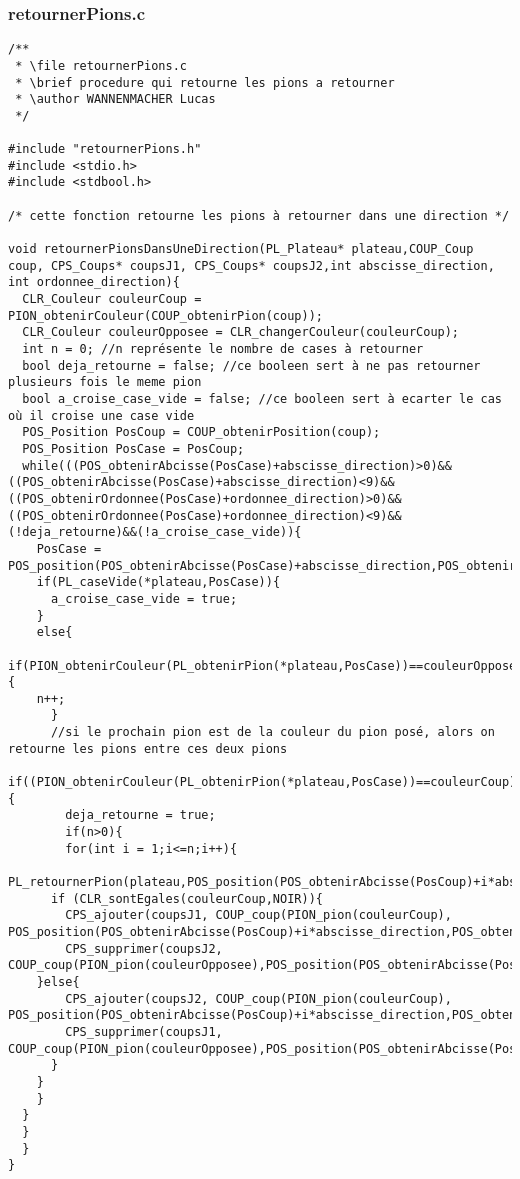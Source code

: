 \subsubsection{retournerPions.c}
\begin{lstlisting}
/**
 * \file retournerPions.c
 * \brief procedure qui retourne les pions a retourner
 * \author WANNENMACHER Lucas
 */

#include "retournerPions.h"
#include <stdio.h>
#include <stdbool.h>

/* cette fonction retourne les pions à retourner dans une direction */

void retournerPionsDansUneDirection(PL_Plateau* plateau,COUP_Coup coup, CPS_Coups* coupsJ1, CPS_Coups* coupsJ2,int abscisse_direction, int ordonnee_direction){
  CLR_Couleur couleurCoup = PION_obtenirCouleur(COUP_obtenirPion(coup));
  CLR_Couleur couleurOpposee = CLR_changerCouleur(couleurCoup);
  int n = 0; //n représente le nombre de cases à retourner
  bool deja_retourne = false; //ce booleen sert à ne pas retourner plusieurs fois le meme pion
  bool a_croise_case_vide = false; //ce booleen sert à ecarter le cas où il croise une case vide
  POS_Position PosCoup = COUP_obtenirPosition(coup);
  POS_Position PosCase = PosCoup;
  while(((POS_obtenirAbcisse(PosCase)+abscisse_direction)>0)&&((POS_obtenirAbcisse(PosCase)+abscisse_direction)<9)&&((POS_obtenirOrdonnee(PosCase)+ordonnee_direction)>0)&&((POS_obtenirOrdonnee(PosCase)+ordonnee_direction)<9)&&(!deja_retourne)&&(!a_croise_case_vide)){
    PosCase = POS_position(POS_obtenirAbcisse(PosCase)+abscisse_direction,POS_obtenirOrdonnee(PosCase)+ordonnee_direction);
    if(PL_caseVide(*plateau,PosCase)){
      a_croise_case_vide = true;
    }
    else{
      if(PION_obtenirCouleur(PL_obtenirPion(*plateau,PosCase))==couleurOpposee){
	n++;
      }
      //si le prochain pion est de la couleur du pion posé, alors on retourne les pions entre ces deux pions
      if((PION_obtenirCouleur(PL_obtenirPion(*plateau,PosCase))==couleurCoup)){
        deja_retourne = true;
        if(n>0){
        for(int i = 1;i<=n;i++){
          PL_retournerPion(plateau,POS_position(POS_obtenirAbcisse(PosCoup)+i*abscisse_direction,POS_obtenirOrdonnee(PosCoup)+i*ordonnee_direction));
	  if (CLR_sontEgales(couleurCoup,NOIR)){
	    CPS_ajouter(coupsJ1, COUP_coup(PION_pion(couleurCoup), POS_position(POS_obtenirAbcisse(PosCoup)+i*abscisse_direction,POS_obtenirOrdonnee(PosCoup)+i*ordonnee_direction)));
	    CPS_supprimer(coupsJ2, COUP_coup(PION_pion(couleurOpposee),POS_position(POS_obtenirAbcisse(PosCoup)+i*abscisse_direction,POS_obtenirOrdonnee(PosCoup)+i*ordonnee_direction)));
	}else{
	    CPS_ajouter(coupsJ2, COUP_coup(PION_pion(couleurCoup), POS_position(POS_obtenirAbcisse(PosCoup)+i*abscisse_direction,POS_obtenirOrdonnee(PosCoup)+i*ordonnee_direction)));
	    CPS_supprimer(coupsJ1, COUP_coup(PION_pion(couleurOpposee),POS_position(POS_obtenirAbcisse(PosCoup)+i*abscisse_direction,POS_obtenirOrdonnee(PosCoup)+i*ordonnee_direction)));
	  }
	}
    }
  }
  }
  }
}



\end{lstlisting}
